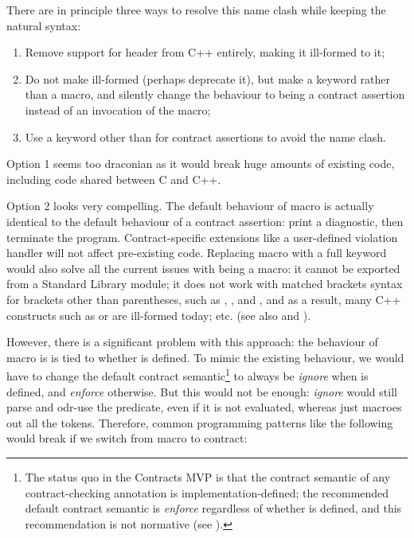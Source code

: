 There are in principle three ways to resolve this name clash while keeping the natural syntax:
\begin{enumerate}
\item Remove support for header  from C++ entirely, making it ill-formed to  it;
\item Do not make  ill-formed (perhaps deprecate it), but make  a keyword rather than a macro, and silently change the behaviour to being a contract assertion instead of an invocation of the macro;
\item Use a keyword other than  for contract assertions to avoid the name clash.
\end{enumerate}
Option 1 seems too draconian as it would break huge amounts of existing code, including code shared between C and C++.

Option 2 looks very compelling. The default behaviour of macro  is actually identical to the default behaviour of a contract assertion: print a diagnostic, then terminate the program. Contract-specific extensions like a user-defined violation handler will not affect pre-existing code. Replacing macro  with a full keyword would also solve all the current issues with  being a macro: it cannot be exported from a Standard Library module; it does not work with matched brackets syntax for brackets other than parentheses, such as , , and \tcode{[...]}, and as a result, many C++ constructs such as  or  are ill-formed today; etc. (see also \cite{P2264R5} and \cite{P2884R0}).

However, there is a significant problem with this approach: the behaviour of macro  is is tied to whether   is defined. To mimic the existing behaviour, we would have to change the default contract semantic\footnote{The status quo in the Contracts MVP is that the contract semantic of any contract-checking annotation is implementation-defined; the recommended default contract semantic is \emph{enforce} regardless of whether  is defined, and this recommendation is not normative (see \cite{P2877R0}).} to always be \emph{ignore} when  is defined, and \emph{enforce} otherwise. But this would not be enough: \emph{ignore} would still parse and odr-use the predicate, even if it is not evaluated, whereas  just macroes out all the tokens. Therefore, common programming patterns like the following would break if we switch  from macro to contract:


